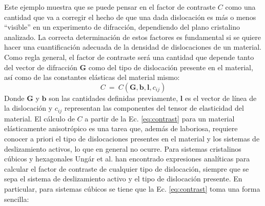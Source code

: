 Este ejemplo muestra que se puede pensar en el factor de contraste $C$ como una cantidad que va a corregir el hecho de que una dada dislocación es más o menos ``visible'' en un experimento de difracción, dependiendo del plano cristalino analizado.
La correcta determinación de estos factores es fundamental si se quiere hacer una cuantificación adecuada de la densidad de dislocaciones de un material.
Como regla general, el factor de contraste será una cantidad que depende tanto del vector de difracción $\mathbf{G}$ como del tipo de dislocación presente en el material, así como de las constantes elásticas del material mismo:
\begin{equation}
  C \ = \ C(\mathbf{G},\mathbf{b},\mathbf{l},c_{ij})
  \label{eq:contrast}
\end{equation}
\noindent
Donde $\mathbf{G}$ y $\mathbf{b}$ son las cantidades definidas previamente, $\mathbf{l}$ es el vector de línea de la dislocación y $c_{ij}$ representan las componentes del tensor de elasticidad del material.
El cálculo de $C$ a partir de la Ec. \ref{eq:contrast} para un material elásticamente anisotrópico es una tarea que, además de laboriosa, requiere conocer a priori el tipo de dislocaciones presentes en el material y los sistemas de deslizamiento activos, lo que en general no ocurre.
Para sistemas cristalinos cúbicos y hexagonales Ungár et al.\cite{Dragomir1999,Dragomir2002} han encontrado expresiones analíticas para calcular el factor de contraste de cualquier tipo de dislocación, siempre que se sepa el sistema de deslizamiento activo y el tipo de dislocación presente. En particular, para sistemas cúbicos se tiene que la Ec. \ref{eq:contrast} toma una forma sencilla:

